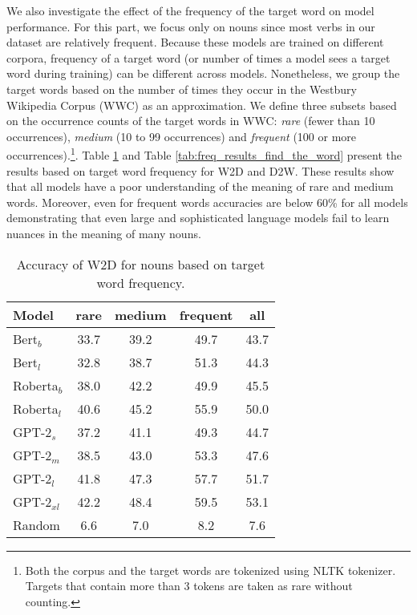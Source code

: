 \documentclass[11pt,a4paper]{article}
\begin{document}
We also investigate the effect of the frequency of the
target word on model performance. For this part, we
focus only on  nouns since most  verbs in our dataset
are relatively frequent. Because these models are trained on
different corpora, frequency of a target word (or number of
times a model sees a target word during training) can be
different across  models. Nonetheless, we group the
target words based on the number of times they occur in the
Westbury Wikipedia Corpus (WWC) \cite{WWC} as an
approximation. We
define three subsets based on the occurrence counts of the
target words in WWC: \textit{rare} (fewer than 10 occurrences),
 \textit{medium} (10 to 99 occurrences) and
 \textit{frequent}
(100 or more occurrences).\footnote{Both the corpus and
  the target words are tokenized using NLTK tokenizer.  Targets
  that contain more than 3 tokens are taken as rare without
  counting.}. Table
\ref{tab:freq_results_find_the_definition} and Table
\ref{tab:freq_results_find_the_word} present the  results
based on target word frequency for
W2D and D2W.
These results show that
all models have a poor understanding of the meaning of 
rare and medium words. Moreover, even for 
frequent words accuracies are below 60\% for all models
demonstrating that even  large and sophisticated language
models fail to learn nuances in the meaning of many
nouns.

\begin{table}
    \centering
    \begin{tabular}{l|cccc}
    \hline
         \textbf{Model} & \textbf{rare} & \textbf{medium} & \textbf{frequent} & \textbf{all} \\ \hline
     Bert$_{b}$ & 33.7 & 39.2 & 49.7 & 43.7 \\
     Bert$_{l}$ & 32.8 & 38.7 & 51.3 & 44.3 \\
     Roberta$_{b}$ & 38.0 & 42.2 & 49.9 & 45.5 \\
     Roberta$_{l}$ & 40.6 & 45.2 & 55.9 & 50.0 \\ \hline
     GPT-2$_{s}$ & 37.2 & 41.1 & 49.3 & 44.7 \\
     GPT-2$_{m}$ & 38.5 & 43.0 & 53.3 & 47.6 \\
     GPT-2$_{l}$ & 41.8 & 47.3 & 57.7 & 51.7 \\
     GPT-2$_{xl}$ & 42.2 & 48.4 & 59.5 & 53.1 \\ \hline
     Random & 6.6 & 7.0 & 8.2 & 7.6 \\ \hline 
     
    \end{tabular}
    \caption{Accuracy of W2D for  nouns based on target word frequency.}
    \label{tab:freq_results_find_the_definition}
\end{table}
\end{document}
